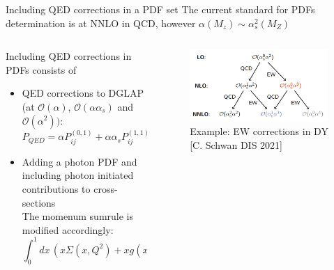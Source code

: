 \documentclass[aspectratio=169, 9pt,t]{beamer}
\begin{document}
\begin{frame}{Including QED corrections in a PDF set}
  The current standard for PDFs determination is at NNLO in QCD, however  $\alpha(M_z) \sim \alpha_s^2(M_Z)$

  \begin{columns}
    \begin{column}{0.49\textwidth}

      \vspace*{1em}
      Including QED corrections in PDFs consists of \vspace*{0.5em}
      \begin{itemize}
        \item QED corrections to DGLAP (at $\mathcal{O}(\alpha)$, $\mathcal{O}(\alpha \alpha_s)$ and $\mathcal{O}(\alpha^2))$: \\
        $P_{QED}=\alpha P_{ij}^{(0,1)}+\alpha \alpha_s P_{ij}^{(1,1)}+\alpha^2 P_{ij}^{(0,2)}+\ldots$
        \vspace*{0.5em}
        \item Adding a photon PDF and including photon initiated contributions to cross-sections \\
        The momenum sumrule is modified accordingly:
        \begin{equation*}
          \int_0^1 dx\, \left(  x\Sigma(x,Q^2) + xg(x,Q^2) + x\gamma(x,Q^2) \right) =1
        \end{equation*}
      \end{itemize}
    \end{column}

    \begin{column}{0.49\textwidth}
      \begin{figure}
        \includegraphics[width=0.99\textwidth]{figures/ewcorrections_dy.png}
        \caption*{Example: EW corrections in DY\\ {\color{gray}\small [C. Schwan DIS 2021]}}
      \end{figure}
    \end{column}
  \end{columns}
\end{frame}
\end{document}
